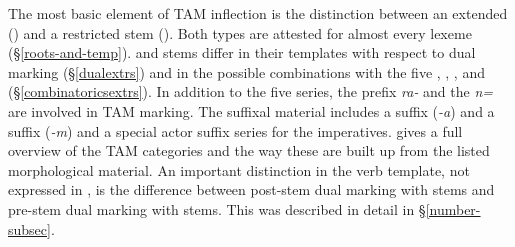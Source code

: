 The most basic element of TAM inflection is the distinction between an extended (\Ext) and a restricted stem (\Rs). Both types are attested for almost every  lexeme ({\S}\ref{roots-and-temp}). {\Ext} and {\Rs} stems differ in their templates with respect to dual marking ({\S}\ref{dualextrs}) and in the possible combinations with the five  \Alph, \Bet, \Betaone, \Betatwo{} and \Gam{} ({\S}\ref{combinatoricsextrs}). In addition to the five series, the  prefix \emph{ra-} and the   \emph{n=} are involved in TAM marking. The suffixal material includes a  suffix (\emph{-a}) and a  suffix (\emph{-m}) and a special actor suffix series for the imperatives.  gives a full overview of the TAM categories and the way these are built up from the listed morphological material. An important distinction in the verb template, not expressed in , is the difference between post-stem dual marking with {\Ext} stems and pre-stem dual marking with {\Rs} stems. This was described in detail in {\S}\ref{number-subsec}.

